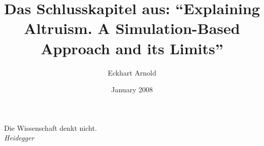 \documentclass[11pt,a4paper,english]{book}
\begin{document}

\title{Das Schlusskapitel aus: "`Explaining Altruism. A Simulation-Based Approach and its
Limits"'}

\author{Eckhart Arnold}
\date{January 2008}

\maketitle


\begin{flushright}
{\small Die Wissenschaft denkt nicht.\\{\em Heidegger}} 
\end{flushright}

\thispagestyle{empty}
\noindent
\vspace{10cm}

% 

\tableofcontents



%
%
%
%
%
%

%

\newpage



\end{document}

